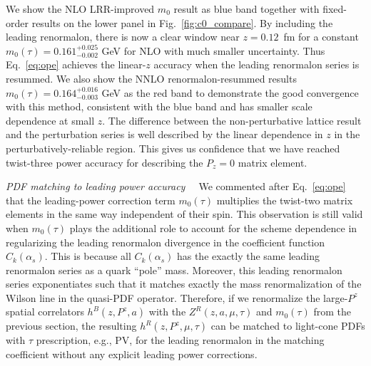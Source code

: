 \documentclass[prd,aps,nofootinbib,superscriptaddress,floatfix,preprintnumbers,twocolumn]{revtex4}
\begin{document}
We show the NLO LRR-improved $m_0$ result as blue band together with fixed-order results on the lower panel in Fig.~\ref{fig:c0_compare}. 
By including the leading renormalon, there is now a clear window near $z=0.12$~fm for a constant $m_0(\tau)= 0.161^{+0.025}_{-0.002}$ GeV for NLO with much smaller uncertainty. Thus Eq.~\eqref{eq:ope} achieves the linear-$z$ accuracy when the leading renormalon series is resummed. We also show the NNLO renormalon-resummed results $m_0(\tau)= 0.164^{+0.016}_{-0.003}$ GeV as the red band to demonstrate the good convergence with this method, consistent with the blue band and has smaller scale dependence at small $z$. The difference between the non-perturbative lattice result and the perturbation series
is well described by the linear dependence in $z$ in the perturbatively-reliable region. This gives us 
confidence that we have reached twist-three power accuracy for
describing the $P_z=0$ matrix element.  

\vskip 2mm

{\it PDF matching to leading power accuracy~~}
We commented after Eq.~\eqref{eq:ope} that the leading-power correction term $m_0(\tau)$ multiplies the twist-two matrix elements in the same way independent of their spin. This observation is still
valid when $m_0(\tau)$ plays the additional role to account
for the scheme dependence in regularizing the 
leading renormalon divergence in the coefficient function $C_k(\alpha_s)$. This is because all $C_k(\alpha_s)$ has the exactly the same leading renormalon series as a quark ``pole'' mass. Moreover, this leading renormalon series exponentiates such that it matches exactly the mass renormalization of the Wilson line in the quasi-PDF operator. Therefore, if we renormalize the large-$P^z$ spatial correlators $h^B(z,P^z,a)$ with the $Z^R(z,a,\mu,\tau)$ and $m_0(\tau)$ from the previous section, the resulting $h^R(z,P^z,\mu,\tau)$ can be matched to light-cone PDFs with $\tau$ prescription, e.g., PV, for the leading renormalon in the matching coefficient without any explicit leading power corrections. 
\end{document}
